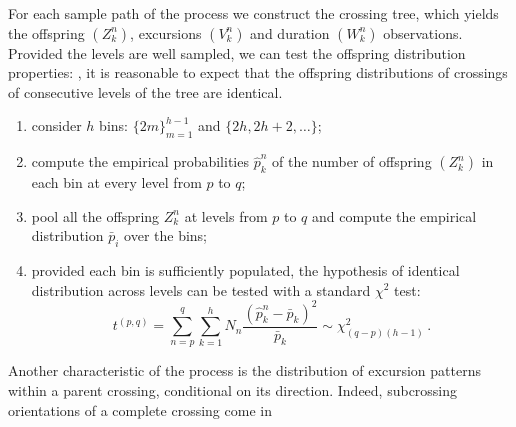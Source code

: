 \documentclass[a4paper]{article}
\newcommand{\pr}{\mathbb{P}}
\begin{document}
For each sample path of the process we construct the crossing tree, which yields
the offspring $(Z_k^n)$, excursions $(V_k^n)$ and duration $(W_k^n)$ observations.
Provided the levels are well sampled, we can test the offspring distribution properties:
\cite{ECP1673}, it is reasonable to
expect that the offspring distributions of crossings of consecutive
levels of the tree are identical.

\begin{enumerate}
    \item consider $h$ bins: $\{2m\}_{m=1}^{h-1}$ and $\{2h, 2h+2,\ldots\}$;
    \item compute the empirical probabilities $\hat{p}_k^n$ of the number of
    offspring $(Z_k^n)$ in each bin at every level from $p$ to $q$;
    \item pool all the offspring $Z_k^n$ at levels from $p$ to $q$ and compute
    the empirical distribution $\bar{p}_i$ over the bins;
    \item provided each bin is sufficiently populated, the hypothesis of identical
    distribution across levels can be tested with a standard $\chi^2$ test:
    \begin{equation*}
        t^{(p,q)} = \sum_{n=p}^q \sum_{k=1}^h N_n
            \frac{(\hat{p}_k^n - \bar{p}_k)^2}{\bar{p}_k}
            \sim \chi^2_{(q-p)(h-1)}
            \,.
    \end{equation*}
\end{enumerate}



Another characteristic of the process is the distribution of excursion patterns within
a parent crossing, conditional on its direction. Indeed, subcrossing orientations
of a complete crossing come in

\end{document}
